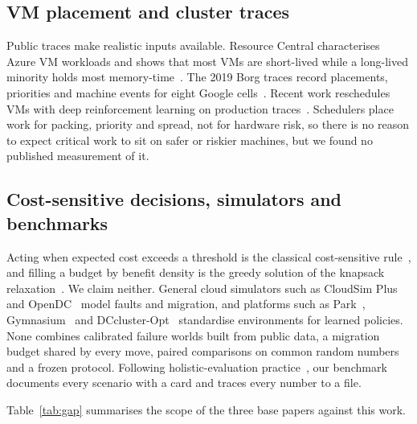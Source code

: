 \documentclass[pdflatex,sn-mathphys-num,iicol]{sn-jnl}
\theoremstyle{thmstyleone}%
\theoremstyle{thmstylethree}%
\begin{document}
\subsection{VM placement and cluster traces}\label{sec:rel-place}

Public traces make realistic inputs available. Resource Central characterises Azure VM workloads
and shows that most VMs are short-lived while a long-lived minority holds most
memory-time~\cite{cortez2017resource}. The 2019 Borg traces record placements, priorities and
machine events for eight Google cells~\cite{tirmazi2020borg}. Recent work reschedules VMs with deep
reinforcement learning on production traces~\cite{ding2025vm2rl}. Schedulers place work for
packing, priority and spread, not for hardware risk, so there is no reason to expect critical work
to sit on safer or riskier machines, but we found no published measurement of it.

\subsection{Cost-sensitive decisions, simulators and benchmarks}\label{sec:rel-bench}

Acting when expected cost exceeds a threshold is the classical cost-sensitive
rule~\cite{elkan2001foundations}, and filling a budget by benefit density is the greedy solution
of the knapsack relaxation~\cite{dantzig1957discrete}. We claim neither. General cloud simulators
such as CloudSim Plus~\cite{cloudsimplus} and OpenDC~\cite{opendc} model faults and migration, and
platforms such as Park~\cite{mao2019park}, Gymnasium~\cite{towers2024gymnasium} and
DCcluster-Opt~\cite{guillenperez2025dccluster} standardise environments for learned policies. None
combines calibrated failure worlds built from public data, a migration budget shared by every
move, paired comparisons on common random numbers and a frozen protocol. Following
holistic-evaluation practice~\cite{liang2023helm}, our benchmark documents every scenario with a
card and traces every number to a file.

Table~\ref{tab:gap} summarises the scope of the three base papers against this work.
\end{document}
